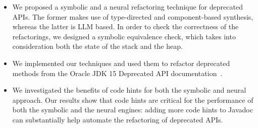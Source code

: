 \documentclass[conference]{IEEEtran}
\begin{document}
\begin{itemize}

\item We proposed a symbolic and a neural refactoring technique for deprecated APIs. The former makes use of type-directed and component-based synthesis, whereas the latter is LLM based. In order to check the correctness of the refactorings, we designed a symbolic equivalence check, which takes into consideration both the state of the stack and the heap.


\item We implemented our techniques and used them to refactor deprecated methods from the Oracle
JDK 15 Deprecated API documentation~\cite{OracleJdk15DeprecatedAPI}.

\item We investigated the benefits of code hints for both the symbolic and neural approach. %
  Our results show that code hints are critical for the performance of both the symbolic and the neural engines: adding more code hints to Javadoc
can substantially help automate the refactoring of deprecated APIs.


\end{itemize}  
\end{document}
